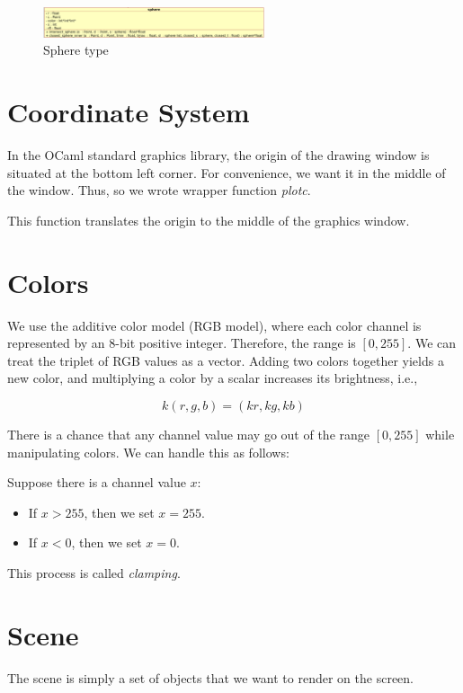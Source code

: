 \documentclass[conference]{IEEEtran}
\begin{document}
\begin{figure}[htbp]
  \centerline{\includegraphics[width=0.58\textwidth]{./figs/spherediagram.png}}
  \caption{Sphere type}
\end{figure}

\section{Coordinate System}

In the OCaml standard graphics library, the origin of the drawing window is situated at the bottom left corner. For convenience, we want it in the middle of the window. Thus, so we wrote wrapper function \textit{plotc}.

This function translates the origin to the middle of the graphics window.

\section{Colors}

We use the additive color model (RGB model), where each color channel is represented by an 8-bit positive integer. Therefore, the range is $[0,255]$. We can treat the triplet of RGB values as a vector. Adding two colors together yields a new color, and multiplying a color by a scalar increases its brightness, i.e.,

$$k (r, g, b) = (kr, kg, kb)$$

There is a chance that any channel value may go out of the range $[0,255]$ while manipulating colors. We can handle this as follows:

Suppose there is a channel value $x$:
\begin{itemize}
    \item If $x > 255$, then we set $x = 255$.
    \item If $x < 0$, then we set $x = 0$.
\end{itemize}

This process is called \textit{clamping}.

\section{Scene}

The scene is simply a set of objects that we want to render on the screen.
\end{document}
